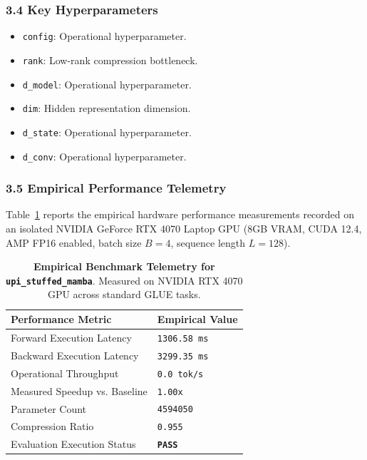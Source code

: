 \subsubsection*{3.4 Key Hyperparameters}
\begin{itemize}
    \item \texttt{config}: Operational hyperparameter.
    \item \texttt{rank}: Low-rank compression bottleneck.
    \item \texttt{d\_model}: Operational hyperparameter.
    \item \texttt{dim}: Hidden representation dimension.
    \item \texttt{d\_state}: Operational hyperparameter.
    \item \texttt{d\_conv}: Operational hyperparameter.
\end{itemize}

\subsubsection*{3.5 Empirical Performance Telemetry}
Table~\ref{tab:telemetry_upi\_stuffed\_mamba} reports the empirical hardware performance measurements recorded on an isolated NVIDIA GeForce RTX 4070 Laptop GPU (8GB VRAM, CUDA 12.4, AMP FP16 enabled, batch size $B=4$, sequence length $L=128$).

\begin{table}[h]
\centering
\small
\caption{\textbf{Empirical Benchmark Telemetry for \texttt{upi\_stuffed\_mamba}}. Measured on NVIDIA RTX 4070 GPU across standard GLUE tasks.}
\label{tab:telemetry_upi\_stuffed\_mamba}
\begin{tabularx}{\columnwidth}{lX}
\toprule
\textbf{Performance Metric} & \textbf{Empirical Value} \\
\midrule
Forward Execution Latency & \texttt{1306.58 ms} \\
Backward Execution Latency & \texttt{3299.35 ms} \\
Operational Throughput & \texttt{0.0 tok/s} \\
Measured Speedup vs. Baseline & \texttt{1.00x} \\
Parameter Count & \texttt{4594050} \\
Compression Ratio & \texttt{0.955} \\
Evaluation Execution Status & \textbf{\texttt{PASS}} \\
\bottomrule
\end{tabularx}
\end{table}

